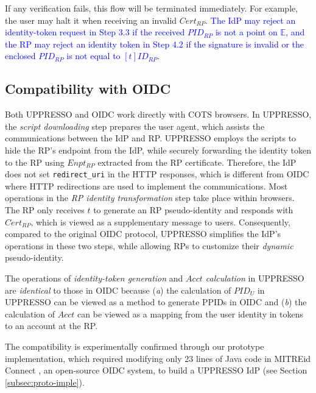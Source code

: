 If any verification fails, this flow will be terminated immediately.
For example, the user may halt it when receiving an invalid $Cert_{RP}$.
\textcolor{blue}{The IdP may reject an identity-token request in Step 3.3 if the received $PID_{RP}$ is not a point on $\mathbb{E}$, and the RP may reject an identity token in Step 4.2 if the signature is invalid or the enclosed $PID_{RP}$ is not equal to $[t]ID_{RP}$.}



\subsection{Compatibility with OIDC}
\label{subsec:compatible}
Both UPPRESSO and OIDC work directly with COTS browsers. %
In UPPRESSO, the \emph{script downloading} step prepares the user agent, which assists the communications between the IdP and RP. UPPRESSO employs the scripts to hide the RP's endpoint from the IdP, while securely forwarding the identity token to the RP using $Enpt_{RP}$ extracted from the RP certificate.
Therefore, the IdP does not set \verb+redirect_uri+ in the HTTP responses, which is different from OIDC where HTTP redirections are used to implement the communications. Most operations in the \emph{RP identity transformation} step take place within browsers. The RP only receives $t$ to generate an RP pseudo-identity and responds with $Cert_{RP}$,
which is viewed as a supplementary message to users.
Consequently, compared to the original OIDC protocol, UPPRESSO simplifies the IdP's operations in these two steps, while allowing RPs to customize their \emph{dynamic} pseudo-identity.

The operations of \emph{identity-token generation} and \emph{$Acct$ calculation} in UPPRESSO are \emph{identical} to those in OIDC because (\emph{a}) the calculation of $PID_U$ in UPPRESSO can be viewed as a method to generate PPIDs in OIDC and (\emph{b}) the calculation of $Acct$ can be viewed as a mapping from the user identity in tokens to an account at the RP.

The compatibility is experimentally confirmed through our prototype implementation, which required modifying only 23 lines of Java code in MITREid Connect \cite{MITREid}, an open-source OIDC system, to build a UPPRESSO IdP (see Section \ref{subsec:proto-imple}).

